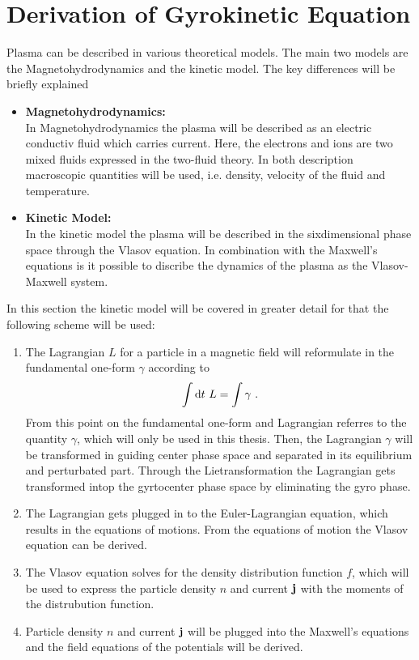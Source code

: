
\chapter{Derivation of Gyrokinetic Equation}
\label{chap:derivationGyrokineticEq}

\thispagestyle{empty}
\newpage

Plasma can be described in various theoretical models. The main two models are the Magnetohydrodynamics and the kinetic model. The key differences will be briefly explained
\begin{itemize}
    \item \textbf{Magnetohydrodynamics:}\\
        In Magnetohydrodynamics the plasma will be described as an electric conductiv fluid which carries current. Here, the electrons and ions are two mixed fluids expressed in the two-fluid theory. In both description macroscopic quantities will be used, i.e. density, velocity of the fluid and temperature.
    \item \textbf{Kinetic Model:}\\
        In the kinetic model the plasma will be described in the sixdimensional phase space through the Vlasov equation. In combination with the Maxwell's equations is it possible to discribe the dynamics of the plasma as the Vlasov-Maxwell system. 
\end{itemize}
\bigskip
In this section the kinetic model will be covered in greater detail for that the following scheme will be used:
\begin{enumerate}
    \item The Lagrangian $L$ for a particle in a magnetic field will reformulate in the fundamental one-form $\gamma$ according to 
        \begin{gather}
            \int \mathrm{d}t ~ L = \int \gamma~.
        \end{gather}
        From this point on the fundamental one-form and Lagrangian referres to the quantity $\gamma$, which will only be used in this thesis. Then, the Lagrangian $\gamma$ will be transformed in guiding center phase space and separated in its equilibrium and perturbated part. Through the Lietransformation the Lagrangian gets transformed intop the gyrtocenter phase space by eliminating the gyro phase. 
    \item The Lagrangian gets plugged in to the Euler-Lagrangian equation, which results in the equations of motions. From the equations of motion the Vlasov equation can be derived.
    \item The Vlasov equation solves for the density distribution function $f$, which will be used to express the particle density $n$ and current $\boldsymbol{\mathbf{j}}$ with the moments of the distrubution function. 
    \item Particle density $n$ and current $\boldsymbol{\mathbf{j}}$ will be plugged into the Maxwell's equations and the field equations of the potentials will be derived.
\end{enumerate}
